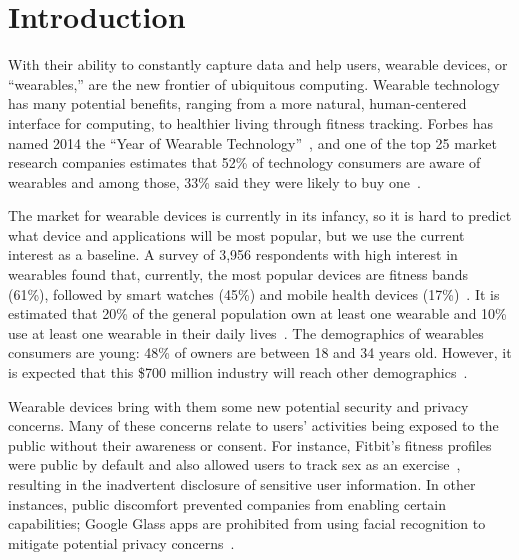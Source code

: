 \documentclass{acm_proc_article-sp}
\begin{document}



\section{Introduction}
With their ability to constantly capture data and help users, wearable devices, or ``wearables,'' are the new frontier of ubiquitous computing. Wearable technology has many potential benefits, ranging from a more natural, human-centered interface for computing, to healthier living through fitness tracking. Forbes has named 2014 the ``Year of Wearable Technology''~\cite{Forbes}, and one of the top 25 market research companies estimates that 52\% of technology consumers are aware of wearables and among those, 33\% said they were likely to buy one~\cite{NPD}. 

The market for wearable devices is currently in its infancy, so it is hard to predict what device and applications will be most popular, but we use the current interest as a baseline. A survey of 3,956 respondents with high interest in wearables found that, currently, the most popular devices are fitness bands (61\%), followed by smart watches (45\%) and mobile health devices (17\%)~\cite{Nilsen}. It is estimated that 20\% of the general population own at least one wearable and 10\% use at least one wearable in their daily lives~\cite{WearableStatNews}. The demographics of wearables consumers are young: 48\% of owners are between 18 and 34 years old. However, it is expected that this \$700 million industry will reach other demographics~\cite{cmo}. 

Wearable devices bring with them some new potential security and privacy concerns. Many of these concerns relate to users' activities being exposed to the public without their awareness or consent. For instance, Fitbit's fitness profiles were public by default and also allowed users to track sex as an exercise~\cite{Fitbit}, resulting in the inadvertent disclosure of sensitive user information. In other instances, public discomfort prevented companies from enabling certain capabilities; Google Glass apps are prohibited from using facial recognition to mitigate potential privacy concerns~\cite{GlassDetection}.
\end{document}
